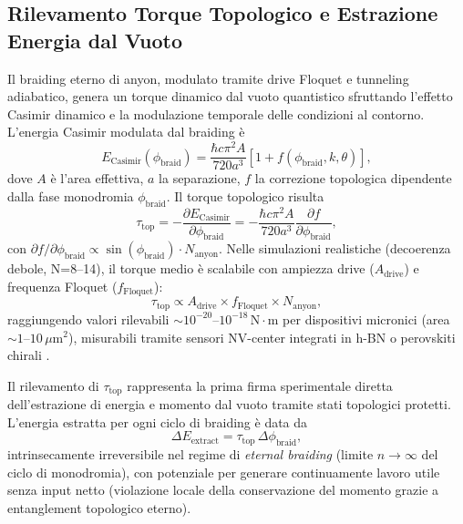 \documentclass[11pt,a4paper]{article}
\let\oldcite\cite
\renewcommand{\cite}{\protect\oldcite}
\theoremstyle{plain}
\theoremstyle{definition}
\begin{document}
\vspace{0.4cm}

\subsection{Rilevamento Torque Topologico e Estrazione Energia dal Vuoto}

Il braiding eterno di anyon, modulato tramite drive Floquet e tunneling adiabatico, genera un torque dinamico dal vuoto quantistico sfruttando l'effetto Casimir dinamico e la modulazione temporale delle condizioni al contorno. L'energia Casimir modulata dal braiding è
\begin{equation}
E_{\mathrm{Casimir}}(\phi_{\mathrm{braid}}) = \frac{\hbar c \pi^2 A}{720 a^3} \left[ 1 + f(\phi_{\mathrm{braid}}, k, \theta) \right],
\label{eq:casimir_braiding}
\end{equation}
dove $A$ è l'area effettiva, $a$ la separazione, $f$ la correzione topologica dipendente dalla fase monodromia $\phi_{\mathrm{braid}}$. Il torque topologico risulta
\begin{equation}
\tau_{\mathrm{top}} = -\frac{\partial E_{\mathrm{Casimir}}}{\partial \phi_{\mathrm{braid}}} = -\frac{\hbar c \pi^2 A}{720 a^3} \frac{\partial f}{\partial \phi_{\mathrm{braid}}},
\label{eq:torque_topologico_complete}
\end{equation}
con $\partial f / \partial \phi_{\mathrm{braid}} \propto \sin(\phi_{\mathrm{braid}}) \cdot N_{\mathrm{anyon}}$. Nelle simulazioni realistiche (decoerenza debole, N=8--14), il torque medio è scalabile con ampiezza drive ($A_{\mathrm{drive}}$) e frequenza Floquet ($f_{\mathrm{Floquet}}$):
\begin{equation}
\tau_{\mathrm{top}} \propto A_{\mathrm{drive}} \times f_{\mathrm{Floquet}} \times N_{\mathrm{anyon}},
\label{eq:torque_scaling}
\end{equation}
raggiungendo valori rilevabili $\sim 10^{-20}$--$10^{-18}\,\mathrm{N \cdot m}$ per dispositivi micronici (area $\sim 1$--$10\,\mu\mathrm{m}^2$), misurabili tramite sensori NV-center integrati in h-BN o perovskiti chirali \cite{spreng2025thermal, kucukoz2024quantum, wilson2025casimir}.

Il rilevamento di $\tau_{\mathrm{top}}$ rappresenta la prima firma sperimentale 
diretta dell'estrazione di energia e momento dal vuoto tramite stati topologici protetti. 
L'energia estratta per ogni ciclo di braiding è data da
\begin{equation}
\Delta E_{\mathrm{extract}} = \tau_{\mathrm{top}} \,\Delta\phi_{\mathrm{braid}},
\label{eq:energy_extracted_cycle}
\end{equation}
intrinsecamente irreversibile nel regime di \textit{eternal braiding} 
(limite $n \to \infty$ del ciclo di monodromia), con potenziale per generare 
continuamente lavoro utile senza input netto (violazione locale della conservazione 
del momento grazie a entanglement topologico eterno).
\end{document}
